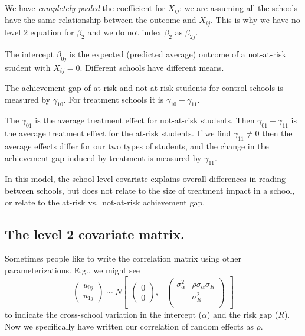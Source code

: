 \documentclass[
  letterpaper,
  DIV=11,
  numbers=noendperiod]{scrreprt}
\begin{document}
We have \emph{completely pooled} the coefficient for \(X_{ij}\): we are
assuming all the schools have the same relationship between the outcome
and \(X_{ij}\). This is why we have no level 2 equation for
\(\beta_{2}\) and we do not index \(\beta_2\) as \(\beta_{2j}\).

The intercept \(\beta_{0j}\) is the expected (predicted average) outcome
of a not-at-risk student with \(X_{ij} = 0\). Different schools have
different means.

The achievement gap of at-risk and not-at-risk students for control
schools is measured by \(\gamma_{10}\). For treatment schools it is
\(\gamma_{10} + \gamma_{11}\).

The \(\gamma_{01}\) is the average treatment effect for not-at-risk
students. Then \(\gamma_{01} + \gamma_{11}\) is the average treatment
effect for the at-risk students. If we find \(\gamma_{11} \neq 0\) then
the average effects differ for our two types of students, and the change
in the achievement gap induced by treatment is measured by
\(\gamma_{11}\).

In this model, the school-level covariate explains overall differences
in reading between schools, but does not relate to the size of treatment
impact in a school, or relate to the at-risk vs.~not-at-risk achievement
gap.

\hypertarget{the-level-2-covariate-matrix.}{%
\subsection{The level 2 covariate
matrix.}\label{the-level-2-covariate-matrix.}}

Sometimes people like to write the correlation matrix using other
parameterizations. E.g., we might see \[
\begin{pmatrix} u_{0j} \\
u_{1j}
\end{pmatrix} \sim  N
\begin{bmatrix}
\begin{pmatrix}
0 \\
0
\end{pmatrix}\!\!,&
\begin{pmatrix}
\sigma^2_\alpha & \rho \sigma_\alpha \sigma_R \\
 & \sigma^2_R \\
\end{pmatrix}
\end{bmatrix}
\] to indicate the cross-school variation in the intercept (\(\alpha\))
and the risk gap (\(R\)). Now we specifically have written our
correlation of random effects as \(\rho\).
\end{document}
